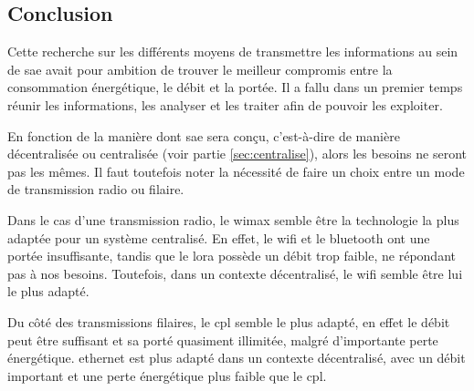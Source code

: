 \subsection{Conclusion}
\label{sec:comparaisonProtocoleCommnunicationConclusion}

Cette recherche sur les différents moyens de transmettre les informations au sein de \gls{sae} avait pour ambition de trouver le meilleur compromis entre
la consommation énergétique, le débit et la portée.
Il a fallu dans un premier temps réunir les informations, les analyser et les traiter afin de pouvoir les exploiter.\newline

En fonction de la manière dont \gls{sae} sera conçu, c'est-à-dire de manière décentralisée ou centralisée (voir partie \ref{sec:centralise}), alors les
besoins ne seront pas les mêmes.
Il faut toutefois noter la nécessité de faire un choix entre un mode de transmission radio ou filaire.\newline

Dans le cas d'une transmission radio, le \gls{wimax} semble être la technologie la plus adaptée pour un système centralisé.
En effet, le \gls{wifi} et le \gls{bluetooth} ont une portée insuffisante, tandis que le \gls{lora} possède un débit trop faible,
ne répondant pas à nos besoins. Toutefois, dans un contexte décentralisé, le \gls{wifi} semble être lui le plus adapté.\newline

Du côté des transmissions filaires, le \gls{cpl} semble le plus adapté, en effet le débit peut être suffisant et sa porté quasiment illimitée, malgré
d'importante perte énergétique. \Gls{ethernet} est plus adapté dans un contexte décentralisé, avec un débit important et une perte énergétique
plus faible que le \gls{cpl}.
